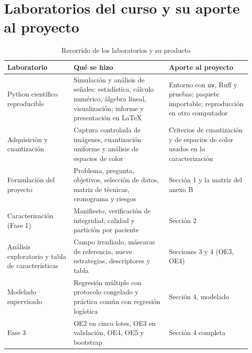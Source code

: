 ﻿\section{Laboratorios del curso y su aporte al proyecto}

\begin{table}[H]
\centering
\small
\caption{Recorrido de los laboratorios y su producto}
\begin{tabular}{@{}p{3.6cm}p{5.4cm}p{4.6cm}@{}}
\toprule
\textbf{Laboratorio} & \textbf{Qué se hizo} & \textbf{Aporte al proyecto} \\
\midrule
Python científico reproducible & Simulación y análisis de señales: estadística,
cálculo numérico, álgebra lineal, visualización; informe y presentación en LaTeX &
Entorno con \texttt{uv}, Ruff y pruebas; paquete importable; reproducción en otro
computador \\
\addlinespace
Adquisición y cuantización & Captura controlada de imágenes, cuantización uniforme
y análisis de espacios de color & Criterios de cuantización y de espacios de color
usados en la caracterización \\
\addlinespace
Formulación del proyecto & Problema, pregunta, objetivos, selección de datos,
matriz de técnicas, cronograma y riesgos & Sección 1 y la matriz del anexo B \\
\addlinespace
Caracterización (Fase 1) & Manifiesto, verificación de integridad, calidad y
partición por paciente & Sección 2 \\
\addlinespace
Análisis exploratorio y tabla de características & Campo irradiado, máscaras de
referencia, nueve estrategias, descriptores y tabla & Secciones 3 y 4 (OE3, OE4) \\
\addlinespace
Modelado supervisado & Regresión múltiple con protocolo congelado y práctica común
con regresión logística & Sección 4, modelado \\
\addlinespace
Fase 3 & OE2 en cinco lotes, OE3 en validación, OE4, OE5 y bootstrap & Sección 4
completa \\
\bottomrule
\end{tabular}
\end{table}
